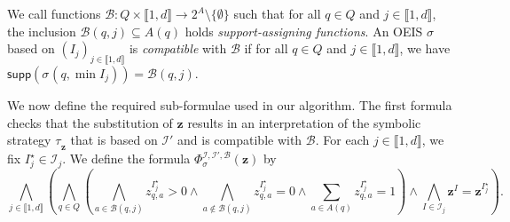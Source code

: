 \documentclass[a4paper,UKenglish,cleveref,autoref,thm-restate,colorlinks]{lipics-v2021}
\newcommand{\integerInterval}[1]{\llbracket{}#1\rrbracket{}}
\newcommand{\subsets}[1]{2^{#1}}
\newcommand{\supp}[1]{\mathsf{supp}(#1)}
\newcommand{\ocStateSpace}{Q}
\newcommand{\ocState}{q}
\newcommand{\ocActionSpace}{A}
\newcommand{\ocAction}{a}
\newcommand{\intPart}{\mathcal{I}}
\newcommand{\interval}{I}
\newcommand{\intNum}{d}
\newcommand{\intIndex}{j}
\newcommand{\varStrat}{z}
\newcommand{\varStratI}{\mathbf{\varStrat}^{\interval}}
\newcommand{\varStratIstar}{\mathbf{\varStrat}^{\interval_\intIndex^{\star}}}
\newcommand{\varStratTuple}{\mathbf{\varStrat}}
\newcommand{\formulaStratBase}{\Phi_{\strat}}
\newcommand{\suppBounded}{\mathcal{B}}
\newcommand{\formulaStratB}{\formulaStratBase^{\intPart,\intPart',\suppBounded}}
\newcommand{\stratGeneric}[1]{{\sigma_{#1}}}
\newcommand{\strat}{\stratGeneric{}}
\newcommand{\stratBGeneric}[1]{{\tau_{#1}}}
\newcommand{\stratB}{\stratBGeneric{}}
\begin{document}
We call functions $\suppBounded\colon\ocStateSpace\times\integerInterval{1, \intNum}\to\subsets{\ocActionSpace}\setminus\{\emptyset\}$ such that for all $\ocState\in\ocStateSpace$ and $\intIndex\in\integerInterval{1, \intNum}$, the inclusion $\suppBounded(\ocState, \intIndex)\subseteq\ocActionSpace(\ocState)$ holds \textit{support-assigning functions}.
An OEIS $\strat$ based on $(\interval_\intIndex)_{\intIndex\in\integerInterval{1, \intNum}}$ is \textit{compatible} with $\suppBounded$ if for all $\ocState\in\ocStateSpace$ and $\intIndex\in\integerInterval{1, \intNum}$,  we have $\supp{\strat(\ocState, \min\interval_\intIndex)} = \suppBounded(\ocState, \intIndex)$.

We now define the required sub-formulae used in our algorithm.
The first formula checks that the substitution of $\varStratTuple$ results in an interpretation of the symbolic strategy $\stratB_{\varStratTuple}$  that is based on $\intPart'$ and is compatible with $\suppBounded$.
For each $\intIndex\in\integerInterval{1, \intNum}$, we fix $\interval_{\intIndex}^\star\in\intPart_\intIndex$.
We define the formula $\formulaStratB(\varStratTuple)$ by 
\begin{equation}\label{equation:formula:strategy:assigned-support}
    \bigwedge_{\intIndex\in\integerInterval{1, \intNum}}
    \left(
    \bigwedge_{\ocState\in\ocStateSpace}\left(
      \bigwedge_{\ocAction\in\suppBounded(\ocState,\intIndex)}
      \varStrat_{\ocState,\ocAction}^{\interval^\star_\intIndex} > 0\land
      \bigwedge_{\ocAction\notin\suppBounded(\ocState,\intIndex)}
      \varStrat_{\ocState,\ocAction}^{\interval^\star_\intIndex} = 0\land
      \sum_{\ocAction\in\ocActionSpace(\ocState)}    \varStrat_{\ocState,\ocAction}^{\interval^\star_\intIndex} = 1
    \right)\land
    \bigwedge_{\interval\in\intPart_\intIndex}
    \varStratI = \varStratIstar
  \right).
\end{equation}
\end{document}

